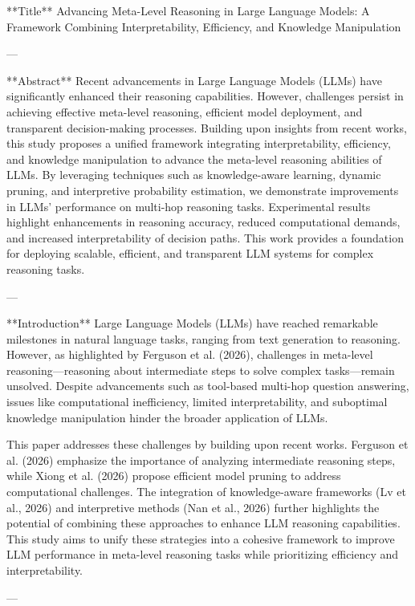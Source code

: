 **Title**  
Advancing Meta-Level Reasoning in Large Language Models: A Framework Combining Interpretability, Efficiency, and Knowledge Manipulation  

---

**Abstract**  
Recent advancements in Large Language Models (LLMs) have significantly enhanced their reasoning capabilities. However, challenges persist in achieving effective meta-level reasoning, efficient model deployment, and transparent decision-making processes. Building upon insights from recent works, this study proposes a unified framework integrating interpretability, efficiency, and knowledge manipulation to advance the meta-level reasoning abilities of LLMs. By leveraging techniques such as knowledge-aware learning, dynamic pruning, and interpretive probability estimation, we demonstrate improvements in LLMs’ performance on multi-hop reasoning tasks. Experimental results highlight enhancements in reasoning accuracy, reduced computational demands, and increased interpretability of decision paths. This work provides a foundation for deploying scalable, efficient, and transparent LLM systems for complex reasoning tasks.  

---

**Introduction**  
Large Language Models (LLMs) have reached remarkable milestones in natural language tasks, ranging from text generation to reasoning. However, as highlighted by Ferguson et al. (2026), challenges in meta-level reasoning—reasoning about intermediate steps to solve complex tasks—remain unsolved. Despite advancements such as tool-based multi-hop question answering, issues like computational inefficiency, limited interpretability, and suboptimal knowledge manipulation hinder the broader application of LLMs.  

This paper addresses these challenges by building upon recent works. Ferguson et al. (2026) emphasize the importance of analyzing intermediate reasoning steps, while Xiong et al. (2026) propose efficient model pruning to address computational challenges. The integration of knowledge-aware frameworks (Lv et al., 2026) and interpretive methods (Nan et al., 2026) further highlights the potential of combining these approaches to enhance LLM reasoning capabilities. This study aims to unify these strategies into a cohesive framework to improve LLM performance in meta-level reasoning tasks while prioritizing efficiency and interpretability.  

---

